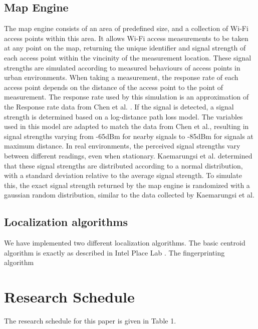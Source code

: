 \documentclass{sig-alternate-br}
\begin{document}
\subsection{Map Engine}
The map engine consists of an area of predefined size, and a collection of Wi-Fi access points within this area. It allows Wi-Fi access measurements to be taken at any point on the map, returning the unique identifier and signal strength of each access point within the vincinity of the measurement location. These signal strengths are simulated according to measured behaviours of access points in urban environments. When taking a measurement, the response rate of each access point depends on the distance of the access point to the point of measurement. The response rate used by this simulation is an approximation of the Response rate data from Chen et al. \cite{cheng:metropolitan-scale}. If the signal is detected, a signal strength is determined based on a log-distance path loss model. The variables used in this model are adapted to match the data from Chen et al., resulting in signal strengths varying from -65dBm for nearby signals to -85dBm for signals at maximum distance. In real environments, the perceived signal strengths vary between different readings, even when stationary. Kaemarungsi et al. determined that these signal strengths are distributed according to a normal distribution, with a standard deviation relative to the average signal strength. To simulate this, the exact signal strength returned by the map engine is randomized with a gaussian random distribution, similar to the data collected by Kaemarungsi et al.

\subsection{Localization algorithms}
We have implemented two different localization algorithms. The basic centroid algorithm is exactly as described in Intel Place Lab \cite{cheng:metropolitan-scale}. The fingerprinting algorithm 

\section{Research Schedule}
The research schedule for this paper is given in Table 1.
\end{document}

